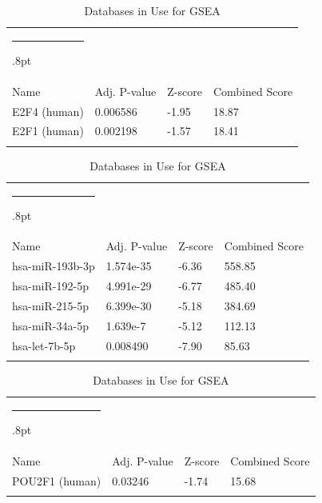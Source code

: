 \documentclass[3p,authoryear,preprint,12pt]{elsarticle}
\makeatletter
\def\hlinewd#1{%
  \noalign{\ifnum0=`}\fi\hrule \@height #1%
  \futurelet\reserved@a\@xhline}
\def\tbltoprule{\hlinewd{.8pt}\\[-12pt]}
\def\tblbottomrule{\noalign{\vspace*{6pt}}\hline\noalign{\vspace*{2pt}}}
\def\tblmidrule{\noalign{\vspace*{6pt}}\hline\noalign{\vspace*{2pt}}}
\makeatother
\begin{document}
\begin{table}[!htbp]
	\caption{{Databases in Use for GSEA} }
	\label{tw-de478ae31cc6}
	\def\arraystretch{1}
	\ignorespaces 
	\centering 
	\begin{tabulary}{\linewidth}{p{\dimexpr.65\tabcolsep}p{\dimexpr.15\tabcolsep}p{\dimexpr.1\tabcolsep}p{\dimexpr.1\tabcolsep}}
		\tbltoprule Name & Adj. P-value & Z-score & Combined Score\\
		\tblmidrule
E2F4 (human) & 0.006586 & -1.95 & 18.87 \\
E2F1 (human) & 0.002198 & -1.57 & 18.41 \\
		\tblbottomrule
	\end{tabulary}\par 
\end{table}
\begin{table}[!htbp]
	\caption{{Databases in Use for GSEA} }
	\label{tw-de478ae31cc6}
	\def\arraystretch{1}
	\ignorespaces 
	\centering 
	\begin{tabulary}{\linewidth}{p{\dimexpr.65\tabcolsep}p{\dimexpr.15\tabcolsep}p{\dimexpr.1\tabcolsep}p{\dimexpr.1\tabcolsep}}
		\tbltoprule Name & Adj. P-value & Z-score & Combined Score\\
		\tblmidrule
hsa-miR-193b-3p & 1.574e-35 & -6.36 & 558.85 \\
hsa-miR-192-5p & 4.991e-29 & -6.77 & 485.40 \\
hsa-miR-215-5p & 6.399e-30 & -5.18 & 384.69 \\
hsa-miR-34a-5p & 1.639e-7 & -5.12 & 112.13 \\
hsa-let-7b-5p & 0.008490 & -7.90 & 85.63 \\
		\tblbottomrule
	\end{tabulary}\par 
\end{table}
\begin{table}[!htbp]
	\caption{{Databases in Use for GSEA} }
	\label{tw-de478ae31cc6}
	\def\arraystretch{1}
	\ignorespaces 
	\centering 
	\begin{tabulary}{\linewidth}{p{\dimexpr.65\tabcolsep}p{\dimexpr.15\tabcolsep}p{\dimexpr.1\tabcolsep}p{\dimexpr.1\tabcolsep}}
		\tbltoprule Name & Adj. P-value & Z-score & Combined Score\\
		\tblmidrule
POU2F1 (human) & 0.03246 & -1.74 & 15.68 \\
		\tblbottomrule
	\end{tabulary}\par 
\end{table}
\end{document}
